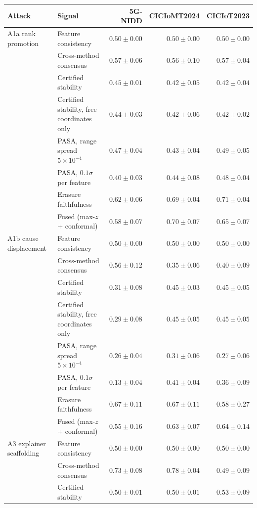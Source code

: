 \begin{tabular}{llrrr}
\toprule
\textbf{Attack} & \textbf{Signal} & \textbf{5G-NIDD} & \textbf{CICIoMT2024} & \textbf{CICIoT2023} \\
\midrule
A1a rank promotion & Feature consistency & $0.50 \pm 0.00$ & $0.50 \pm 0.00$ & $0.50 \pm 0.00$ \\
 & Cross-method consensus & $0.57 \pm 0.06$ & $0.56 \pm 0.10$ & $0.57 \pm 0.04$ \\
 & Certified stability & $0.45 \pm 0.01$ & $0.42 \pm 0.05$ & $0.42 \pm 0.04$ \\
 & Certified stability, free coordinates only & $0.44 \pm 0.03$ & $0.42 \pm 0.06$ & $0.42 \pm 0.02$ \\
 & PASA, range spread $5\times10^{-4}$ & $0.47 \pm 0.04$ & $0.43 \pm 0.04$ & $0.49 \pm 0.05$ \\
 & PASA, $0.1\sigma$ per feature & $0.40 \pm 0.03$ & $0.44 \pm 0.08$ & $0.48 \pm 0.04$ \\
 & Erasure faithfulness & $0.62 \pm 0.06$ & $0.69 \pm 0.04$ & $0.71 \pm 0.04$ \\
 & Fused (max-$z$ + conformal) & $0.58 \pm 0.07$ & $0.70 \pm 0.07$ & $0.65 \pm 0.07$ \\
\addlinespace
A1b cause displacement & Feature consistency & $0.50 \pm 0.00$ & $0.50 \pm 0.00$ & $0.50 \pm 0.00$ \\
 & Cross-method consensus & $0.56 \pm 0.12$ & $0.35 \pm 0.06$ & $0.40 \pm 0.09$ \\
 & Certified stability & $0.31 \pm 0.08$ & $0.45 \pm 0.03$ & $0.45 \pm 0.05$ \\
 & Certified stability, free coordinates only & $0.29 \pm 0.08$ & $0.45 \pm 0.05$ & $0.45 \pm 0.05$ \\
 & PASA, range spread $5\times10^{-4}$ & $0.26 \pm 0.04$ & $0.31 \pm 0.06$ & $0.27 \pm 0.06$ \\
 & PASA, $0.1\sigma$ per feature & $0.13 \pm 0.04$ & $0.41 \pm 0.04$ & $0.36 \pm 0.09$ \\
 & Erasure faithfulness & $0.67 \pm 0.11$ & $0.67 \pm 0.11$ & $0.58 \pm 0.27$ \\
 & Fused (max-$z$ + conformal) & $0.55 \pm 0.16$ & $0.63 \pm 0.07$ & $0.64 \pm 0.14$ \\
\addlinespace
A3 explainer scaffolding & Feature consistency & $0.50 \pm 0.00$ & $0.50 \pm 0.00$ & $0.50 \pm 0.00$ \\
 & Cross-method consensus & $0.73 \pm 0.08$ & $0.78 \pm 0.04$ & $0.49 \pm 0.09$ \\
 & Certified stability & $0.50 \pm 0.01$ & $0.50 \pm 0.01$ & $0.53 \pm 0.09$ \\

\end{tabular}
